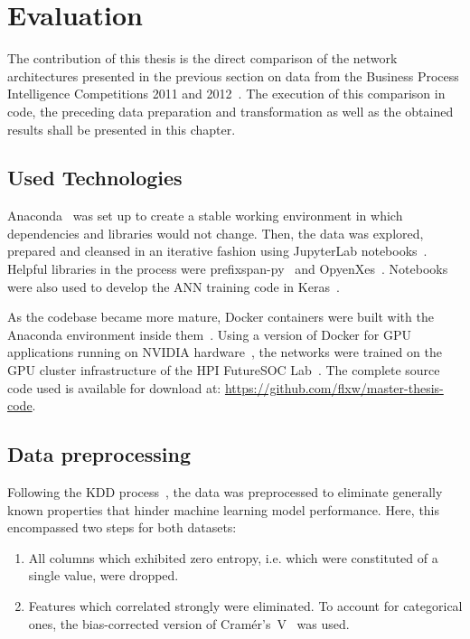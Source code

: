 \chapter{Evaluation}\label{chap:evaluation}
The contribution of this thesis is the direct comparison of the network architectures presented in the previous section on data from the Business Process Intelligence Competitions 2011 and 2012~\cite{BPIC2011, BPIC2012}. The execution of this comparison in code, the preceding data preparation and transformation as well as the obtained results shall be presented in this chapter.

\section{Used Technologies}
Anaconda~\cite{web:anaconda} was set up to create a stable working environment in which dependencies and libraries would not change.
Then, the data was explored, prepared and cleansed in an iterative fashion using JupyterLab notebooks~\cite{web:jupyter}. Helpful libraries in the process were prefixspan-py~\cite{web:prefixspan-py} and OpyenXes~\cite{web:opyenxes}. Notebooks were also used to develop the ANN training code in Keras~\cite{web:keras}.

As the codebase became more mature, Docker containers were built with the Anaconda environment inside them~\cite{web:docker}. Using a version of Docker for GPU applications running on NVIDIA hardware~\cite{web:nvidia-docker}, the networks were trained on the GPU cluster infrastructure of the HPI FutureSOC Lab~\cite{web:fsoc}. The complete source code used is available for download at: \url{https://github.com/flxw/master-thesis-code}.

\section{Data preprocessing}
Following the KDD process~\cite{fayyad1996data}, the data was preprocessed to eliminate generally known properties that hinder machine learning model performance. Here, this encompassed two steps for both datasets:

\begin{enumerate}
    \item All columns which exhibited zero entropy, i.e. which were constituted of a single value, were dropped.
    \item Features which correlated strongly were eliminated. To account for categorical ones, the bias-corrected version of Cramér's~V~\cite{bergsma2013bias} was used.
\end{enumerate}


